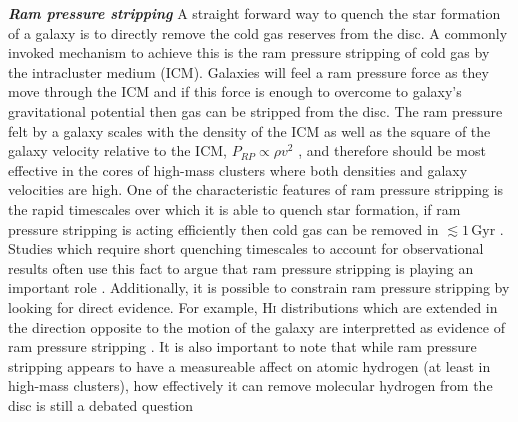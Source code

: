 \noindent \textit{\textbf{Ram pressure stripping}}
\smallskip
\newline
A straight forward way to quench the star formation of a galaxy
is to directly remove the cold gas reserves from the disc.  A commonly invoked
mechanism to achieve this is the ram pressure stripping of cold gas by the
intracluster medium (ICM).  Galaxies will feel a ram pressure force as
they move through the ICM and if this force is enough to overcome to
galaxy's gravitational potential then gas can be stripped from the
disc.  The ram pressure felt by a galaxy scales with the density of
the ICM as well as the square of the galaxy velocity relative to the ICM,
$P_{RP} \propto \rho v^2$ \citep{gunn1972}, and therefore should be
most effective in the cores of high-mass clusters where both densities
and galaxy velocities are high.  One of the characteristic
features of ram pressure stripping is the rapid timescales over which
it is able to quench star formation, if ram pressure stripping is
acting efficiently then cold gas can be removed in $\lesssim
\! 1\,\mathrm{Gyr}$ \citep{abadi1999, quilis2000, roediger2005,
  steinhauser2016}.  Studies which require short
quenching timescales to account for observational results often use
this fact to argue that ram pressure stripping is playing an important
role \citep{muzzin2014, fillingham2015, wetzel2015}.  Additionally, it
is possible to constrain ram
pressure stripping by looking for direct evidence.  For example,
H\textsc{i} distributions which are extended in the direction opposite
to the motion of the galaxy are interpretted as evidence of ram
pressure stripping \citep{kenney2004, chung2007,
  chung2009, kenney2015}.  It is also important to note that while
ram pressure stripping appears to have a measureable affect on atomic
hydrogen (at least in high-mass clusters), how
effectively it can remove molecular hydrogen from the disc is still a
debated question \citep{boselli2002, boselli2006, fumagalli2009,
  sivanandam2014} \newline

